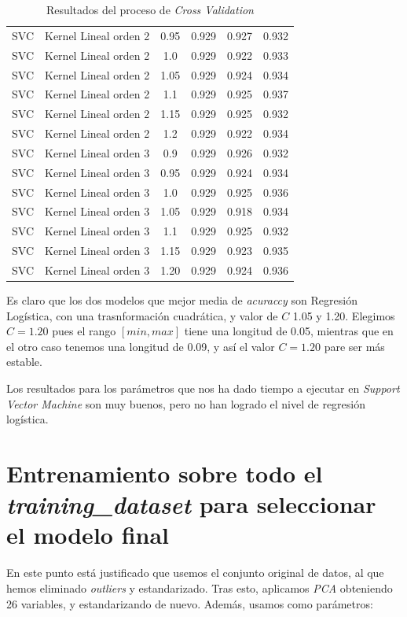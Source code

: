 \documentclass[11pt]{article}
\begin{document}
\begin{table}
\begin{tabular}{|c|c|c|c|c|c|}
    SVC & Kernel Lineal orden 2 & 0.95 & 0.929 & 0.927 & 0.932 \\
    SVC & Kernel Lineal orden 2 & 1.0 & 0.929 & 0.922 & 0.933 \\
    SVC & Kernel Lineal orden 2 & 1.05 & 0.929 & 0.924 & 0.934 \\
    SVC & Kernel Lineal orden 2 & 1.1 & 0.929 & 0.925 & 0.937 \\
    SVC & Kernel Lineal orden 2 & 1.15 & 0.929 & 0.925 & 0.932 \\
    SVC & Kernel Lineal orden 2 & 1.2 & 0.929 & 0.922 & 0.934 \\
    SVC & Kernel Lineal orden 3 & 0.9 & 0.929 & 0.926 & 0.932 \\
    SVC & Kernel Lineal orden 3 & 0.95 & 0.929 & 0.924 & 0.934 \\
    SVC & Kernel Lineal orden 3 & 1.0 & 0.929 & 0.925 & 0.936 \\
    SVC & Kernel Lineal orden 3 & 1.05 & 0.929 & 0.918 & 0.934 \\
    SVC & Kernel Lineal orden 3 & 1.1 & 0.929 & 0.925 & 0.932 \\
    SVC & Kernel Lineal orden 3 & 1.15 & 0.929 & 0.923 & 0.935 \\
    SVC & Kernel Lineal orden 3 & 1.20 & 0.929 & 0.924 & 0.936 \\
    \hline
\end{tabular}
    \caption{Resultados del proceso de \emph{Cross Validation}}
    \label{tabla_cv_clasif}
\end{table}

Es claro que los dos modelos que mejor media de \emph{acuraccy} son Regresión Logística, con una trasnformación cuadrática, y valor de $C$ 1.05 y 1.20. Elegimos $C = 1.20$ pues el rango $[min, max]$ tiene una longitud de 0.05, mientras que en el otro caso tenemos una longitud de 0.09, y así el valor $C=1.20$ pare ser más estable.

Los resultados para los parámetros que nos ha dado tiempo a ejecutar en \emph{Support Vector Machine} son muy buenos, pero no han logrado el nivel de regresión logística.

\pagebreak

\section{Entrenamiento sobre todo el \emph{training\_dataset} para seleccionar el modelo final}

En este punto está justificado que usemos el conjunto original de datos, al que hemos eliminado \emph{outliers} y estandarizado. Tras esto, aplicamos \emph{PCA} obteniendo 26 variables, y estandarizando de nuevo. Además, usamos como parámetros:
\end{document}
